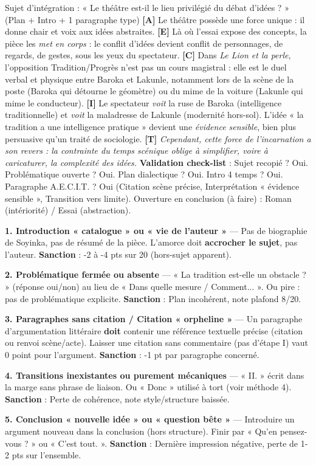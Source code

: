 \documentclass[11pt]{article}
\begin{document}
\begin{exoresolu}{Sujet d'intégration : « Le théâtre est-il le lieu privilégié du débat d'idées ? » (Plan + Intro + 1 paragraphe type)}
\textbf{[A]} Le théâtre possède une force unique : il donne chair et voix aux idées abstraites. \textbf{[E]} Là où l'essai expose des concepts, la pièce les \emph{met en corps} : le conflit d'idées devient conflit de personnages, de regards, de gestes, sous les yeux du spectateur. \textbf{[C]} Dans \emph{Le Lion et la perle}, l'opposition Tradition/Progrès n'est pas un cours magistral : elle est le duel verbal et physique entre Baroka et Lakunle, notamment lors de la scène de la poste (Baroka qui détourne le géomètre) ou du mime de la voiture (Lakunle qui mime le conducteur). \textbf{[I]} Le spectateur \emph{voit} la ruse de Baroka (intelligence traditionnelle) et \emph{voit} la maladresse de Lakunle (modernité hors-sol). L'idée « la tradition a une intelligence pratique » devient une \emph{évidence sensible}, bien plus persuasive qu'un traité de sociologie. \textbf{[T]} \emph{Cependant, cette force de l'incarnation a son revers : la contrainte du temps scénique oblige à simplifier, voire à caricaturer, la complexité des idées.}
\tcblower
\textbf{Validation check-list} : Sujet recopié ? Oui. Problématique ouverte ? Oui. Plan dialectique ? Oui. Intro 4 temps ? Oui. Paragraphe A.E.C.I.T. ? Oui (Citation scène précise, Interprétation « évidence sensible », Transition vers limite). Ouverture en conclusion (à faire) : Roman (intériorité) / Essai (abstraction).
\end{exoresolu}

\begin{attention}
\textbf{1. Introduction « catalogue » ou « vie de l'auteur »} — Pas de biographie de Soyinka, pas de résumé de la pièce. L'amorce doit \textbf{accrocher le sujet}, pas l'auteur. \textbf{Sanction} : -2 à -4 pts sur 20 (hors-sujet apparent).\par
\textbf{2. Problématique fermée ou absente} — « La tradition est-elle un obstacle ? » (réponse oui/non) au lieu de « Dans quelle mesure / Comment... ». Ou pire : pas de problématique explicite. \textbf{Sanction} : Plan incohérent, note plafond 8/20.\par
\textbf{3. Paragraphes sans citation / Citation « orpheline »} — Un paragraphe d'argumentation littéraire \textbf{doit} contenir une référence textuelle précise (citation ou renvoi scène/acte). Laisser une citation sans commentaire (pas d'étape I) vaut 0 point pour l'argument. \textbf{Sanction} : -1 pt par paragraphe concerné.\par
\textbf{4. Transitions inexistantes ou purement mécaniques} — « II. » écrit dans la marge sans phrase de liaison. Ou « Donc » utilisé à tort (voir méthode 4). \textbf{Sanction} : Perte de cohérence, note style/structure baissée.\par
\textbf{5. Conclusion « nouvelle idée » ou « question bête »} — Introduire un argument nouveau dans la conclusion (hors structure). Finir par « Qu'en pensez-vous ? » ou « C'est tout. ». \textbf{Sanction} : Dernière impression négative, perte de 1-2 pts sur l'ensemble.
\end{attention}
\end{document}
